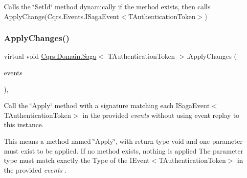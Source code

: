 Calls the \char`\"{}\+Set\+Id\char`\"{} method dynamically if the method exists, then calls Apply\+Change(\+Cqrs.\+Events.\+I\+Saga\+Event$<$\+T\+Authentication\+Token$>$) 

\mbox{\label{classCqrs_1_1Domain_1_1Saga_aa46571a6a68f8232955d3bac3be40c4a_aa46571a6a68f8232955d3bac3be40c4a}} 
\subsubsection{\texorpdfstring{Apply\+Changes()}{ApplyChanges()}\hspace{0.1cm}{\footnotesize\ttfamily [1/2]}}
{\footnotesize\ttfamily virtual void \hyperlink{classCqrs_1_1Domain_1_1Saga}{Cqrs.\+Domain.\+Saga}$<$ T\+Authentication\+Token $>$.Apply\+Changes (\begin{DoxyParamCaption}\item[{I\+Enumerable$<$ \hyperlink{interfaceCqrs_1_1Events_1_1ISagaEvent}{I\+Saga\+Event}$<$ T\+Authentication\+Token $>$$>$}]{events }\end{DoxyParamCaption})\hspace{0.3cm}{\ttfamily [protected]}, {\ttfamily [virtual]}}



Call the \char`\"{}\+Apply\char`\"{} method with a signature matching each I\+Saga\+Event$<$\+T\+Authentication\+Token$>$ in the provided {\itshape events}  without using event replay to this instance. 

This means a method named \char`\"{}\+Apply\char`\"{}, with return type void and one parameter must exist to be applied. If no method exists, nothing is applied The parameter type must match exactly the Type of the I\+Event$<$\+T\+Authentication\+Token$>$ in the provided {\itshape events} . \mbox{\label{classCqrs_1_1Domain_1_1Saga_a73de6a7e67618f9aa2eb1ef6d988d297_a73de6a7e67618f9aa2eb1ef6d988d297}} 

